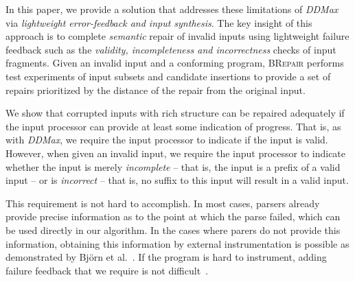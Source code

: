 \documentclass[sigconf,review,anonymous]{acmart}
\newcounter{todocounter}
\newcommand{\todo}[1]{\marginpar{$|$}\textcolor{red}{\stepcounter{todocounter}\footnote[\thetodocounter]{\textcolor{red}{\textbf{TODO }}\textit{#1}}}}
\renewcommand{\todo}[1]{}
\newcommand{\approach}{\textsc{BRepair}\xspace}
\newcommand{\ddmax}{\textit{DDMax}\xspace}
\begin{document}

In this paper, we provide a solution that addresses these limitations of \ddmax via \textit{lightweight error-feedback and input synthesis}. The key insight of this approach is to complete \textit{semantic} repair of invalid inputs using lightweight failure feedback such as the \textit{validity, incompleteness and incorrectness} checks of input fragments. Given an invalid input and a conforming program, \approach performs test experiments of input subsets and candidate insertions to provide a set of repairs prioritized by the distance of the repair from the original input.
\todo{what else is the main ingredient or key insight of the approach}

\todo{to Move/restructure}
We show that corrupted inputs with rich structure can be repaired adequately if
the input processor can provide at least some indication of progress.
That is, as with \ddmax, we require the input processor to indicate if the input
is valid.  However, when given an invalid input, we require the input processor
to indicate whether the input is merely \emph{incomplete} -- that is, the input
is a prefix of a valid input -- or is \emph{incorrect} -- that is, no suffix to
this input will result in a valid input. 

This requirement is not hard to accomplish. In most cases, parsers already
provide precise information as to the point at which the parse failed, which
can be used directly in our algorithm. In the cases where parers do not provide
this information, obtaining this information by external instrumentation is
possible as demonstrated by Bj\"orn et al.~\cite{mathis2019parser}. If
the program is hard to instrument, adding failure feedback that we require is
not difficult~\todo{
The arxiv link is~\cite{gopinath2020fuzzing} but we can't cite it because
bFuzzer is getting submitted at FSE too. -> alright, we can cite it after if accepted}.
\end{document}
